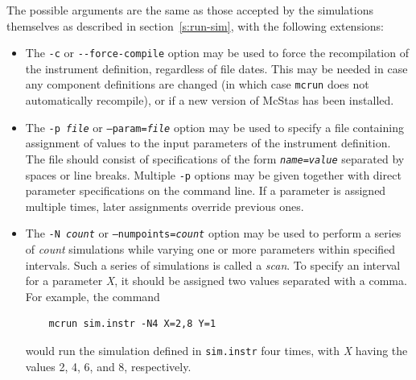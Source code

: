 The possible arguments are the same as those accepted by the simulations
themselves as described in section~\ref{s:run-sim}, with the following
extensions:
\begin{itemize}
\item The \verb+-c+ or \verb+--force-compile+ option may be used to force
  the recompilation of the instrument definition, regardless of file
  dates. This may be needed in case any component definitions are
  changed (in which case \verb+mcrun+ does not automatically recompile),
  or if a new version of McStas has been installed.
\item The \texttt{-p {\it file}} or \texttt{--param={\it file}} option
  may be used to specify a file containing assignment of values to the
  input parameters of the instrument definition. The file should consist
  of specifications of the form \texttt{{\it name\/}={\it value\/}}
  separated by spaces or line breaks. Multiple \verb+-p+ options may be
  given together with direct parameter specifications on the command
  line. If a parameter is assigned multiple times, later assignments
  override previous ones.
\item The \texttt{-N {\it count}} or \texttt{--numpoints={\it count}} option
  may be used to perform a series of \textit{count\/} simulations while
  varying one or more parameters within specified intervals. Such a
  series of simulations is called a \emph{scan}. To specify
  an interval for a parameter \textit{X}, it should be assigned two
  values separated with a comma. For example, the command
\begin{verbatim}
    mcrun sim.instr -N4 X=2,8 Y=1
\end{verbatim}
would run the simulation defined in \verb+sim.instr+ four times, with
\textit{X} having the values 2, 4, 6, and 8, respectively.


\end{itemize}
